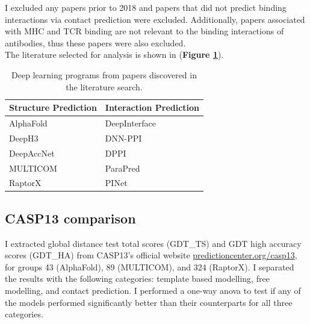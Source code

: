 I excluded any papers prior to 2018 and papers that did not predict binding interactions via contact prediction were excluded. Additionally, papers associated with MHC and TCR binding are not relevant to the binding interactions of antibodies, thus these papers were also excluded.
\\[12pt]
The literature selected for analysis is shown in (\textbf{Figure \ref{tab:literature-overview}}).

\begin{table}[H]
    \begin{small}
        \caption{Deep learning programs from papers discovered in the literature search.}
        \label{tab:literature-overview}
        \begin{center}
            \begin{tabular}[c]{l|l}
                \hline
                \multicolumn{1}{c|}{\textbf{Structure Prediction}} & 
                \multicolumn{1}{c}{\textbf{Interaction Prediction}} \\
                \hline
                AlphaFold \cite{seniorImprovedProteinStructure2020} & DeepInterface \cite{balciDeepInterfaceProteinproteinInterface2019} \\
        
                DeepH3 \cite{ruffoloGeometricPotentialsDeep2020}  & DNN-PPI \cite{liDeepNeuralNetwork2018}  \\
                DeepAccNet \cite{hiranumaImprovedProteinStructure2021} & DPPI \cite{hashemifarPredictingProteinProtein2018} \\
                MULTICOM \cite{houMULTICOMProteinStructure2020a} &  ParaPred \cite{liberisParapredAntibodyParatope2018} \\
                RaptorX \cite{xuAnalysisDistancebasedProtein2019} & PINet \cite{daiProteinInteractionInterface2021} \\
                
                \hline
            \end{tabular}
        \end{center}
    \end{small}
\end{table}


\subsection{CASP13 comparison}

I extracted global distance test total scores (GDT\_TS) and GDT high accuracy scores (GDT\_HA) from CASP13's official website \href{https://predictioncenter.org/casp13/}{predictioncenter.org/casp13}, for groups 43 (AlphaFold), 89 (MULTICOM), and 324 (RaptorX). I separated the results with the following categories: template based modelling, free modelling, and contact prediction. I performed a one-way anova to test if any of the models performed significantly better than their counterparts for all three categories.

